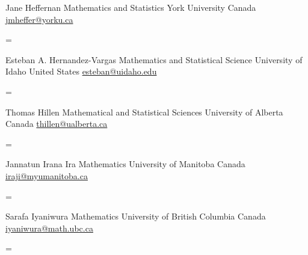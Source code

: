 \documentclass[
  letterpaper,
  DIV=11,
  numbers=noendperiod]{scrartcl}
\newenvironment{absolutelynopagebreak}
  {\par\nobreak\vfil\penalty0\vfilneg
   \vtop\bgroup}
  {\par\xdef\tpd{\the\prevdepth}\egroup
   \prevdepth=\tpd}
\begin{document}
\begin{absolutelynopagebreak}Jane   Heffernan \newline
\mbox{}\quad  Mathematics and Statistics \newline
\mbox{}\quad  York University \newline
\mbox{}\quad  Canada \newline
\mbox{}\quad \href{mailto: jmheffer@yorku.ca }{ jmheffer@yorku.ca }
\end{absolutelynopagebreak}\vskip0.2cm
\begin{absolutelynopagebreak}Esteban A.   Hernandez-Vargas \newline
\mbox{}\quad  Mathematics and Statistical Science \newline
\mbox{}\quad  University of Idaho \newline
\mbox{}\quad  United States \newline
\mbox{}\quad \href{mailto: esteban@uidaho.edu }{ esteban@uidaho.edu }
\end{absolutelynopagebreak}\vskip0.2cm
\begin{absolutelynopagebreak}Thomas   Hillen \newline
\mbox{}\quad  Mathematical and Statistical Sciences \newline
\mbox{}\quad  University of Alberta \newline
\mbox{}\quad  Canada \newline
\mbox{}\quad \href{mailto: thillen@ualberta.ca }{ thillen@ualberta.ca }
\end{absolutelynopagebreak}\vskip0.2cm
\begin{absolutelynopagebreak}Jannatun Irana   Ira \newline
\mbox{}\quad  Mathematics \newline
\mbox{}\quad  University of Manitoba \newline
\mbox{}\quad  Canada \newline
\mbox{}\quad \href{mailto: iraji@myumanitoba.ca }{ iraji@myumanitoba.ca }
\end{absolutelynopagebreak}\vskip0.2cm
\begin{absolutelynopagebreak}Sarafa   Iyaniwura \newline
\mbox{}\quad  Mathematics \newline
\mbox{}\quad  University of British Columbia \newline
\mbox{}\quad  Canada \newline
\mbox{}\quad \href{mailto: iyaniwura@math.ubc.ca }{ iyaniwura@math.ubc.ca }
\end{absolutelynopagebreak}\vskip0.2cm
\end{document}

